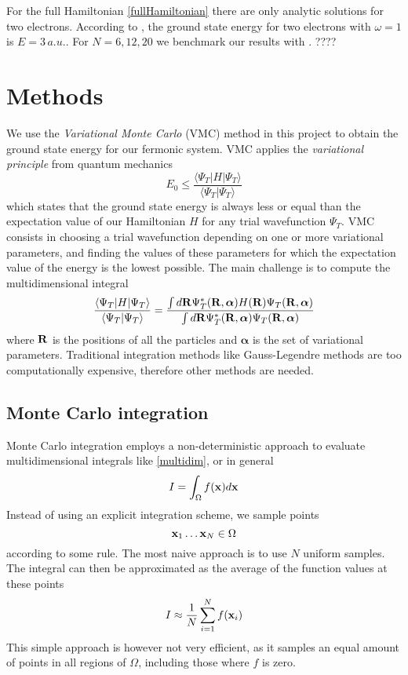 \documentclass[english, a4paper]{article}
\begin{document}
\noindent For the full Hamiltonian \eqref{fullHamiltonian} there are only analytic solutions
for two electrons. According to \cite{ref1}, the ground state energy for two electrons
with $\omega = 1$ is $E = 3 \, a.u.$. For $N = 6,12,20$ we benchmark our results with \cite{ref2}. ????

\section{Methods}

We use the \textit{Variational Monte Carlo} (VMC) method in this project to obtain the ground state energy
for our fermonic system. VMC applies the \textit{variational principle} from quantum mechanics
\begin{equation}
 E_0 \leq \frac{\langle \Psi_T | H | \Psi_T \rangle}{\langle \Psi_T | \Psi_T \rangle}
\end{equation}
which states that the ground state energy is always less or equal than the expectation value of our Hamiltonian $H$
for any trial wavefunction $\Psi_T$. VMC consists in choosing a trial wavefunction depending on one or more
variational parameters, and finding the values of these parameters for which the expectation value of the 
energy is the lowest possible. The main challenge is to compute the multidimensional integral
\begin{equation}
 \frac{\langle \Psi_T | H | \Psi_T \rangle}{\langle \Psi_T | \Psi_T \rangle} = 
 \frac{\int d {\bf R} \Psi_T^*({\bf R}, \boldsymbol{\alpha}) H({\bf R}) \Psi_T({\bf R}, \boldsymbol{\alpha})}
       {\int d {\bf R} \Psi_T^*({\bf R}, \boldsymbol{\alpha}) \Psi_T({\bf R}, \boldsymbol{\alpha})}
 \label{multidim}
\end{equation}
where $\bf{R}$ is the positions of all the particles and $\boldsymbol{\alpha}$ is the set of variational parameters.
Traditional integration methods like Gauss-Legendre methods are too computationally expensive, therefore 
other methods are needed.

\subsection{Monte Carlo integration}

Monte Carlo integration employs a non-deterministic approach to evaluate multidimensional integrals like \eqref{multidim}, or
in general
\begin{equation}
 I = \int_\Omega f({\bf x}) d{\bf x}
\end{equation}
Instead of using an explicit integration scheme, we sample points
\begin{equation}
 {\bf x}_1 \dots {\bf x}_N \in \Omega
\end{equation}
according to some rule. The most naive approach is to use $N$ uniform samples. 
The integral can then be approximated as the average of the function values at these points
\begin{equation}
 I \approx \frac{1}{N} \sum_{i=1}^N f({\bf x}_i)
\end{equation}
This simple approach is however not very efficient, as it samples an equal amount of points in all regions of $\Omega$, 
including those where $f$ is zero. 
\end{document}

